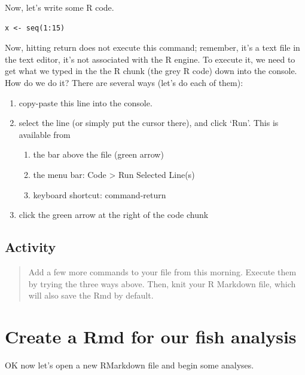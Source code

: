 \documentclass[]{book}
\providecommand{\tightlist}{%
  \setlength{\itemsep}{0pt}\setlength{\parskip}{0pt}}
\begin{document}
Now, let's write some R code.

\begin{verbatim}
x <- seq(1:15)
\end{verbatim}

Now, hitting return does not execute this command; remember, it's a text file in the text editor, it's not associated with the R engine. To execute it, we need to get what we typed in the the R chunk (the grey R code) down into the console. How do we do it? There are several ways (let's do each of them):

\begin{enumerate}
\def\labelenumi{\arabic{enumi}.}
\tightlist
\item
  copy-paste this line into the console.
\item
  select the line (or simply put the cursor there), and click `Run'. This is available from

  \begin{enumerate}
  \def\labelenumii{\alph{enumii}.}
  \tightlist
  \item
    the bar above the file (green arrow)
  \item
    the menu bar: Code \textgreater{} Run Selected Line(s)
  \item
    keyboard shortcut: command-return
  \end{enumerate}
\item
  click the green arrow at the right of the code chunk
\end{enumerate}

\hypertarget{activity-3}{%
\subsection{Activity}\label{activity-3}}

\begin{quote}
Add a few more commands to your file from this morning. Execute them by trying the three ways above. Then, knit your R Markdown file, which will also save the Rmd by default.
\end{quote}

\hypertarget{create-a-rmd-for-our-fish-analysis}{%
\section{Create a Rmd for our fish analysis}\label{create-a-rmd-for-our-fish-analysis}}

OK now let's open a new RMarkdown file and begin some analyses.
\end{document}

